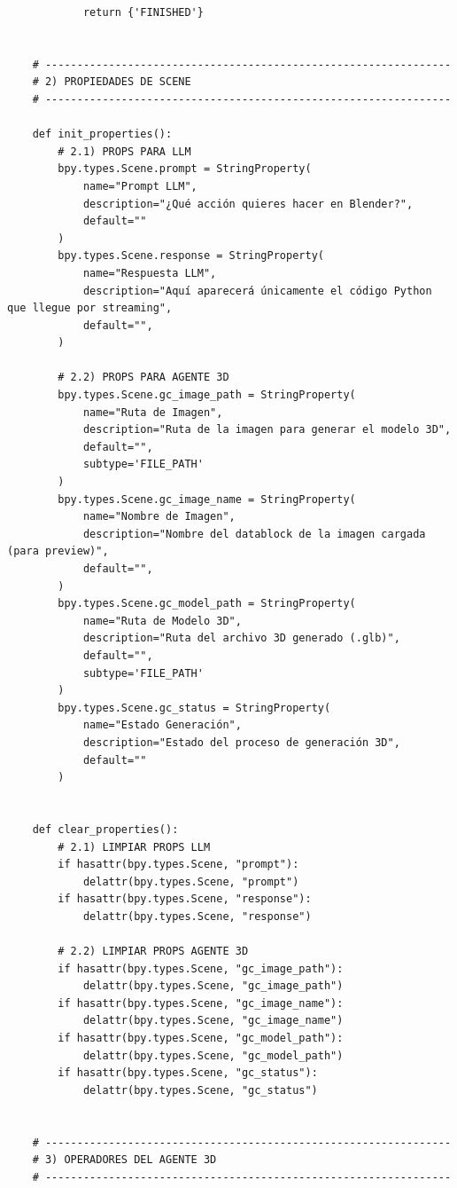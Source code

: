 \begin{verbatim}
            return {'FINISHED'}
    
    
    # ----------------------------------------------------------------
    # 2) PROPIEDADES DE SCENE
    # ----------------------------------------------------------------
    
    def init_properties():
        # 2.1) PROPS PARA LLM
        bpy.types.Scene.prompt = StringProperty(
            name="Prompt LLM",
            description="¿Qué acción quieres hacer en Blender?",
            default=""
        )
        bpy.types.Scene.response = StringProperty(
            name="Respuesta LLM",
            description="Aquí aparecerá únicamente el código Python que llegue por streaming",
            default="",
        )
    
        # 2.2) PROPS PARA AGENTE 3D
        bpy.types.Scene.gc_image_path = StringProperty(
            name="Ruta de Imagen",
            description="Ruta de la imagen para generar el modelo 3D",
            default="",
            subtype='FILE_PATH'
        )
        bpy.types.Scene.gc_image_name = StringProperty(
            name="Nombre de Imagen",
            description="Nombre del datablock de la imagen cargada (para preview)",
            default="",
        )
        bpy.types.Scene.gc_model_path = StringProperty(
            name="Ruta de Modelo 3D",
            description="Ruta del archivo 3D generado (.glb)",
            default="",
            subtype='FILE_PATH'
        )
        bpy.types.Scene.gc_status = StringProperty(
            name="Estado Generación",
            description="Estado del proceso de generación 3D",
            default=""
        )
    
    
    def clear_properties():
        # 2.1) LIMPIAR PROPS LLM
        if hasattr(bpy.types.Scene, "prompt"):
            delattr(bpy.types.Scene, "prompt")
        if hasattr(bpy.types.Scene, "response"):
            delattr(bpy.types.Scene, "response")
    
        # 2.2) LIMPIAR PROPS AGENTE 3D
        if hasattr(bpy.types.Scene, "gc_image_path"):
            delattr(bpy.types.Scene, "gc_image_path")
        if hasattr(bpy.types.Scene, "gc_image_name"):
            delattr(bpy.types.Scene, "gc_image_name")
        if hasattr(bpy.types.Scene, "gc_model_path"):
            delattr(bpy.types.Scene, "gc_model_path")
        if hasattr(bpy.types.Scene, "gc_status"):
            delattr(bpy.types.Scene, "gc_status")
    
    
    # ----------------------------------------------------------------
    # 3) OPERADORES DEL AGENTE 3D
    # ----------------------------------------------------------------
    

\end{verbatim}
